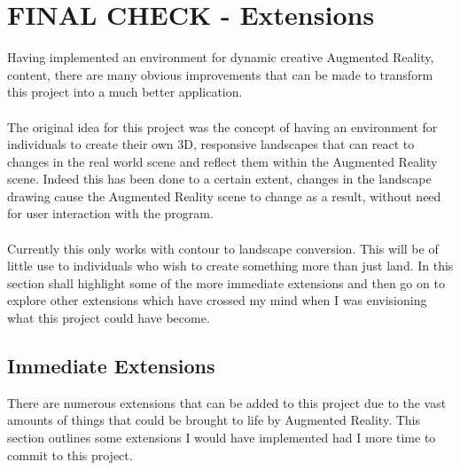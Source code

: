 \documentclass[11pt]{article}
\begin{document}
\section{FINAL CHECK - Extensions}
\label{chapter:extensions}
Having implemented an environment for dynamic creative Augmented Reality,
content, there are many obvious improvements that can be made to transform 
this project into a much better application. \\
\\
The original idea for this project was the concept of having an environment
for individuals to create their own 3D, responsive landscapes that can react
to changes in the real world scene and reflect them within the Augmented Reality scene. Indeed
this has been done to a certain extent, changes in the landscape drawing cause
the Augmented Reality scene to change as a result, without need for user interaction with the
program.\\
\\
Currently this only works with contour to landscape conversion. This
will be of little use to individuals who wish to create something more 
than just land. In this section shall highlight some of the more 
immediate extensions and then go on to explore other extensions 
which have crossed my mind when I was envisioning what 
this project could have become.

\subsection{Immediate Extensions}
There are numerous extensions that can be added to this project due to the 
vast amounts of things that could be brought to life by Augmented Reality.
This section outlines some extensions I would have implemented had I
more time to commit to this project.
\end{document}
